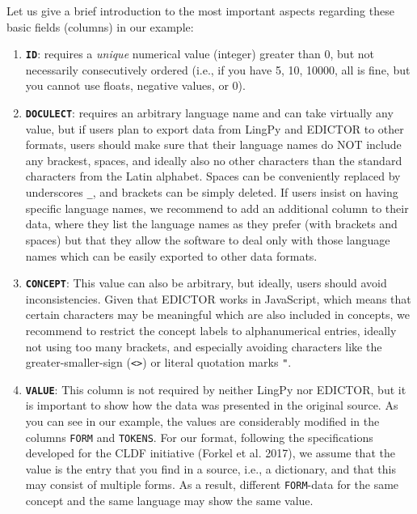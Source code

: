 \documentclass[a4paper,svgnames]{scrartcl}
\providecommand{\tightlist}{%
  \setlength{\itemsep}{0pt}\setlength{\parskip}{0pt}}
\begin{document}
Let us give a brief introduction to the most important aspects regarding
these basic fields (columns) in our example:

\begin{enumerate}
\def\labelenumi{\arabic{enumi}.}
\tightlist
\item
  \textbf{\texttt{ID}}: requires a \emph{unique} numerical value (integer) greater
  than 0, but not necessarily consecutively ordered (i.e., if you have
  5, 10, 10000, all is fine, but you cannot use floats, negative values,
  or 0).
\item
  \textbf{\texttt{DOCULECT}}: requires an arbitrary language name and
  can take virtually any value, but if users plan to export data from
  LingPy and EDICTOR to other formats, users should make sure that their
  language names do NOT include any brackest, spaces, and ideally also
  no other characters than the standard characters from the Latin
  alphabet. Spaces can be conveniently replaced by underscores
  \texttt{\_}, and brackets can be simply deleted. If users insist on
  having specific language names, we recommend to add an additional
  column to their data, where they list the language names as they
  prefer (with brackets and spaces) but that they allow the software to
  deal only with those language names which can be easily exported to
  other data formats.
\item
  \textbf{\texttt{CONCEPT}}: This value can also be arbitrary, but
  ideally, users should avoid inconsistencies. Given that EDICTOR works
  in JavaScript, which means that certain characters may be meaningful
  which are also included in concepts, we recommend to restrict the
  concept labels to alphanumerical entries, ideally not using too many
  brackets, and especially avoiding characters like the
  greater-smaller-sign (\texttt{\textless{}\textgreater{}}) or literal
  quotation marks \texttt{"}.
\item
  \textbf{\texttt{VALUE}}: This column is not required by neither LingPy
  nor EDICTOR, but it is important to show how the data was presented in
  the original source. As you can see in our example, the values are
  considerably modified in the columns \texttt{FORM} and
  \texttt{TOKENS}. For our format, following the specifications
  developed for the CLDF initiative (Forkel et al. 2017), we assume that
  the value is the entry that you find in a source, i.e., a dictionary,
  and that this may consist of multiple forms. As a result, different
  \texttt{FORM}-data for the same concept and the same language may show
  the same value.

\end{enumerate}
\end{document}
